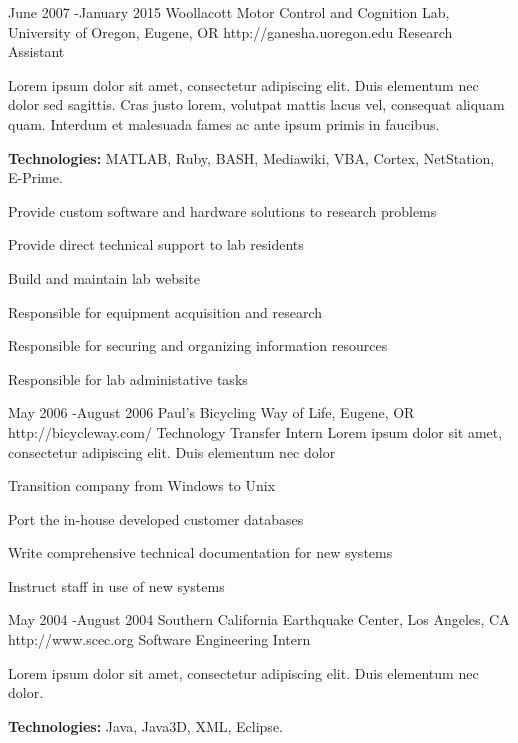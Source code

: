 \documentclass[10pt]{article} %
\begin{document}
\job
{June 2007 -}{January 2015}
{Woollacott Motor Control and Cognition Lab, University of Oregon, Eugene, OR}
{http://ganesha.uoregon.edu}
{Research Assistant}
{Lorem ipsum dolor sit amet, consectetur adipiscing elit. Duis elementum nec dolor sed sagittis. Cras justo lorem, volutpat mattis lacus vel, consequat aliquam quam. Interdum et malesuada fames ac ante ipsum primis in faucibus.\\
\rule{0mm}{5mm}\textbf{Technologies:} MATLAB, Ruby, BASH, Mediawiki, VBA, Cortex, NetStation, E-Prime.}
\begin{itemize-noindent}
\item{Provide custom software and hardware solutions to research problems}
\item{Provide direct technical support to lab residents}
\item{Build and maintain lab website}
\item{Responsible for equipment acquisition and research}
\item{Responsible for securing and organizing information resources}
\item{Responsible for lab administative tasks}
\end{itemize-noindent}


\job
{May 2006 -}{August 2006}
{Paul's Bicycling Way of Life, Eugene, OR}
{http://bicycleway.com/}
{Technology Transfer Intern}
{Lorem ipsum dolor sit amet, consectetur adipiscing elit. Duis elementum nec dolor}

\begin{itemize-noindent}
\item{Transition company from Windows to Unix}
\item{Port the in-house developed customer databases}
\item{Write comprehensive technical documentation for new systems}
\item{Instruct staff in use of new systems}
\end{itemize-noindent}


\job
{May 2004 -}{August 2004}
{Southern California Earthquake Center, Los Angeles, CA}
{http://www.scec.org}
{Software Engineering Intern}
{Lorem ipsum dolor sit amet, consectetur adipiscing elit. Duis elementum nec dolor. \\
\rule{0mm}{5mm}\textbf{Technologies:} Java, Java3D, XML, Eclipse.}
\end{document}
